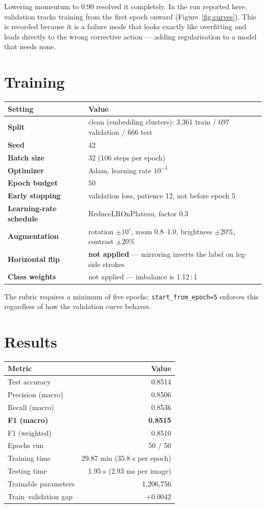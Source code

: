 \documentclass[11pt,a4paper]{article}
\begin{document}
Lowering momentum to 0.90 resolved it completely. In the run reported here, validation
tracks training from the first epoch onward (Figure~\ref{fig:curves}). This is recorded
because it is a failure mode that looks exactly like overfitting and leads directly to
the wrong corrective action --- adding regularisation to a model that needs none.

\section{Training}

\begin{tabularx}{\linewidth}{@{}>{\bfseries}p{5.0cm}X@{}}
\toprule
Setting & Value \\
\midrule
Split & clean (embedding clusters): 3,361 train / 697 validation / 666 test \\
Seed & 42 \\
Batch size & 32 (106 steps per epoch) \\
Optimizer & Adam, learning rate $10^{-3}$ \\
Epoch budget & 50 \\
Early stopping & validation loss, patience 12, not before epoch 5 \\
Learning-rate schedule & ReduceLROnPlateau, factor 0.3 \\
Augmentation & rotation $\pm10^\circ$, zoom 0.8--1.0, brightness $\pm20\%$, contrast $\pm20\%$ \\
Horizontal flip & \textbf{not applied} --- mirroring inverts the label on leg-side strokes \\
Class weights & not applied --- imbalance is 1.12\,:\,1 \\
\bottomrule
\end{tabularx}

The rubric requires a minimum of five epochs; \texttt{start\_from\_epoch=5} enforces this
regardless of how the validation curve behaves.

\section{Results}

\begin{center}
\begin{tabular}{@{}lr@{}}
\toprule
\textbf{Metric} & \textbf{Value} \\
\midrule
Test accuracy & 0.8514 \\
Precision (macro) & 0.8506 \\
Recall (macro) & 0.8536 \\
\textbf{F1 (macro)} & \textbf{0.8515} \\
F1 (weighted) & 0.8510 \\
\midrule
Epochs run & 50 / 50 \\
Training time & 29.87 min (35.8 s per epoch) \\
Testing time & 1.95 s (2.93 ms per image) \\
Trainable parameters & 1,206,756 \\
Train--validation gap & $+0.0042$ \\
\bottomrule
\end{tabular}
\end{center}
\end{document}
